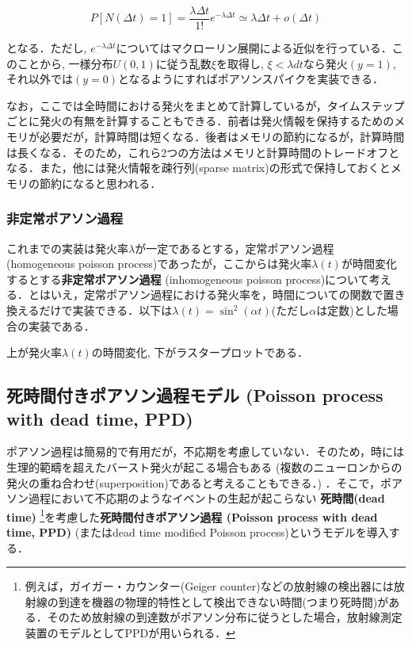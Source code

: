 \begin{equation}
P[N(\Delta t)=1]=\dfrac{\lambda \Delta t}{1 !} e^{-\lambda \Delta t}\simeq \lambda \Delta t+o(\Delta t)
\end{equation}


となる．ただし, $e^{-\lambda \Delta t}$についてはマクローリン展開による近似を行っている．このことから, 一様分布$U(0,1)$に従う乱数$\xi$を取得し, $\xi<\lambda dt$なら発火$(y=1)$, それ以外では$(y=0)$となるようにすればポアソンスパイクを実装できる．




なお，ここでは全時間における発火をまとめて計算しているが，タイムステップごとに発火の有無を計算することもできる．前者は発火情報を保持するためのメモリが必要だが，計算時間は短くなる．後者はメモリの節約になるが，計算時間は長くなる．そのため，これら2つの方法はメモリと計算時間のトレードオフとなる．また，他には発火情報を疎行列(sparse matrix)の形式で保持しておくとメモリの節約になると思われる．
\subsubsection{非定常ポアソン過程}
これまでの実装は発火率$\lambda$が一定であるとする，定常ポアソン過程 (homogeneous poisson process)であったが，ここからは発火率$\lambda(t)$が時間変化するとする\textbf{非定常ポアソン過程} (inhomogeneous poisson process)について考える．とはいえ，定常ポアソン過程における発火率を，時間についての関数で置き換えるだけで実装できる．以下は$\lambda(t)=\sin^2(\alpha t)$(ただし$\alpha$は定数)とした場合の実装である．


上が発火率$\lambda(t)$の時間変化, 下がラスタープロットである．
\subsection{死時間付きポアソン過程モデル (Poisson process with dead time, PPD)}
ポアソン過程は簡易的で有用だが，不応期を考慮していない．そのため，時には生理的範疇を超えたバースト発火が起こる場合もある (複数のニューロンからの発火の重ね合わせ(superposition)であると考えることもできる．) ．そこで，ポアソン過程において不応期のようなイベントの生起が起こらない \textbf{死時間(dead time)} \footnote{例えば，ガイガー・カウンター(Geiger counter)などの放射線の検出器には放射線の到達を機器の物理的特性として検出できない時間(つまり死時間)がある．そのため放射線の到達数がポアソン分布に従うとした場合，放射線測定装置のモデルとしてPPDが用いられる．}を考慮した\textbf{死時間付きポアソン過程 (Poisson process with dead time, PPD)} (またはdead time modified Poisson process)というモデルを導入する．

